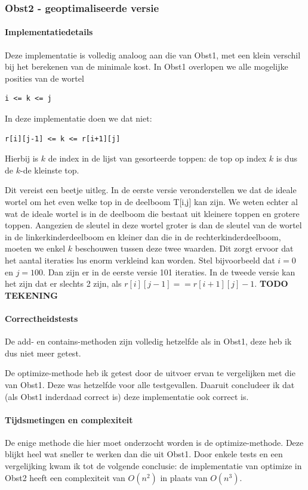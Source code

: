 \documentclass[titlepage,a4paper]{article}
\begin{document}
\subsubsection{Obst2 - geoptimaliseerde versie}
\paragraph{Implementatiedetails}
Deze implementatie is volledig analoog aan die van Obst1, met een klein verschil bij het berekenen van de minimale kost. In Obst1 overlopen we alle mogelijke posities van de wortel \begin{verbatim}i <= k <= j\end{verbatim}
In deze implementatie doen we dat niet: \begin{verbatim}r[i][j-1] <= k <= r[i+1][j]\end{verbatim}

Hierbij is $k$ de index in de lijst van gesorteerde toppen: de top op index $k$ is dus de $k$-de kleinste top.

Dit vereist een beetje uitleg. In de eerste versie veronderstellen we dat de ideale wortel om het even welke top in de deelboom T[i,j] kan zijn. We weten echter al wat de ideale wortel is in de deelboom die bestaat uit kleinere toppen en grotere toppen. Aangezien de sleutel in deze wortel groter is dan de sleutel van de wortel in de linkerkinderdeelboom en kleiner dan die in de rechterkinderdeelboom, moeten we enkel $k$ beschouwen tussen deze twee waarden. Dit zorgt ervoor dat het aantal iteraties lus enorm verkleind kan worden. Stel bijvoorbeeld dat $i=0$ en $j=100$. Dan zijn er in de eerste versie 101 iteraties. In de tweede versie kan het zijn dat er slechts 2 zijn, als $r[i][j-1] == r[i+1][j]-1$.
\textbf{TODO TEKENING}

\paragraph{Correctheidstests}
De add- en contains-methoden zijn volledig hetzelfde als in Obst1, deze heb ik dus niet meer getest.

De optimize-methode heb ik getest door de uitvoer ervan te vergelijken met die van Obst1. Deze was hetzelfde voor alle testgevallen. Daaruit concludeer ik dat (als Obst1 inderdaad correct is) deze implementatie ook correct is.

\paragraph{Tijdsmetingen en complexiteit}
De enige methode die hier moet onderzocht worden is de optimize-methode. Deze blijkt heel wat sneller te werken dan die uit Obst1. Door enkele tests en een vergelijking kwam ik tot de volgende conclusie: de implementatie van optimize in Obst2 heeft een complexiteit van $O(n^2)$ in plaats van $O(n^3)$.
\end{document}
